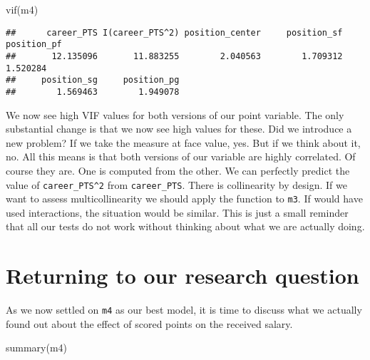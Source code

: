 \documentclass[
]{book}
\newenvironment{Shaded}{\begin{snugshade}}{\end{snugshade}}
\newcommand{\FunctionTok}[1]{\textcolor[rgb]{0.00,0.00,0.00}{#1}}
\newcommand{\FunctionTok}[1]{\textcolor[rgb]{0.13,0.29,0.53}{\textbf{#1}}}
\newcommand{\NormalTok}[1]{#1}
\begin{document}
\begin{Shaded}
\begin{Highlighting}[]
\FunctionTok{vif}\NormalTok{(m4)}
\end{Highlighting}
\end{Shaded}

\begin{verbatim}
##      career_PTS I(career_PTS^2) position_center     position_sf     position_pf 
##       12.135096       11.883255        2.040563        1.709312        1.520284 
##     position_sg     position_pg 
##        1.569463        1.949078
\end{verbatim}

We now see high VIF values for both versions of our point variable. The only
substantial change is that we now see high values for these. Did we introduce a
new problem? If we take the measure at face value, yes. But if we think about
it, no. All this means is that both versions of our variable are highly
correlated. Of course they are. One is computed from the other. We can
perfectly predict the value of \texttt{career\_PTS\^{}2} from \texttt{career\_PTS}. There is
collinearity by design. If we want to assess multicollinearity we should apply
the function to \texttt{m3}. If would have used interactions, the situation would be
similar. This is just a small reminder that all our tests do not work without
thinking about what we are actually doing.

\hypertarget{returning-to-our-research-question-2}{%
\section{Returning to our research question}\label{returning-to-our-research-question-2}}

As we now settled on \texttt{m4} as our best model, it is time to discuss what we
actually found out about the effect of scored points on the received salary.

\begin{Shaded}
\begin{Highlighting}[]
\FunctionTok{summary}\NormalTok{(m4)}
\end{Highlighting}
\end{Shaded}
\end{document}
